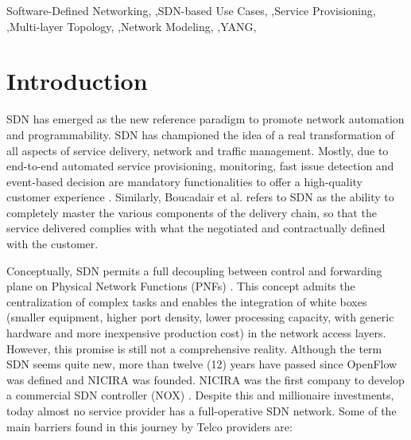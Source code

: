 \documentclass[a4paper,fleqn]{cas-dc}
\begin{document}


\begin{keywords}
Software-Defined Networking,
\sep SDN-based Use Cases, 
\sep Service Provisioning,
\sep Multi-layer Topology,
\sep Network Modeling, 
\sep YANG,  
\end{keywords}

\maketitle

\section{Introduction}
SDN has emerged as the new reference paradigm to promote network automation and programmability. SDN has championed the idea of a real transformation of all aspects of service delivery, network and traffic management. Mostly, due to end-to-end automated service provisioning, monitoring, fast issue detection and event-based decision are mandatory functionalities to offer a high-quality customer experience \cite{ordonez2017network,ong2017onf}. Similarly, Boucadair et al. \cite{boucadair2014software} refers to SDN as the ability to completely master the various components of the delivery chain, so that the service delivered complies with what the negotiated and contractually defined with the customer.

Conceptually, SDN permits a full decoupling between control and forwarding plane on Physical Network Functions (PNFs) \cite{brief2014openflow}. This concept admits the centralization of complex tasks and enables the integration of white boxes (smaller equipment, higher port density, lower processing capacity, with generic hardware and more inexpensive production cost) in the network access layers. However, this promise is still not a comprehensive reality. Although the term SDN seems quite new, more than twelve (12) years have passed since OpenFlow \cite{brief2014openflow} was defined and NICIRA was founded. NICIRA was the first company to develop a commercial SDN controller (NOX) \cite{gude2008nox,tavakoli2009applying}. Despite this and millionaire investments, today almost no service provider has a full-operative SDN network. Some of the main barriers found in this journey by Telco providers are:
\end{document}
